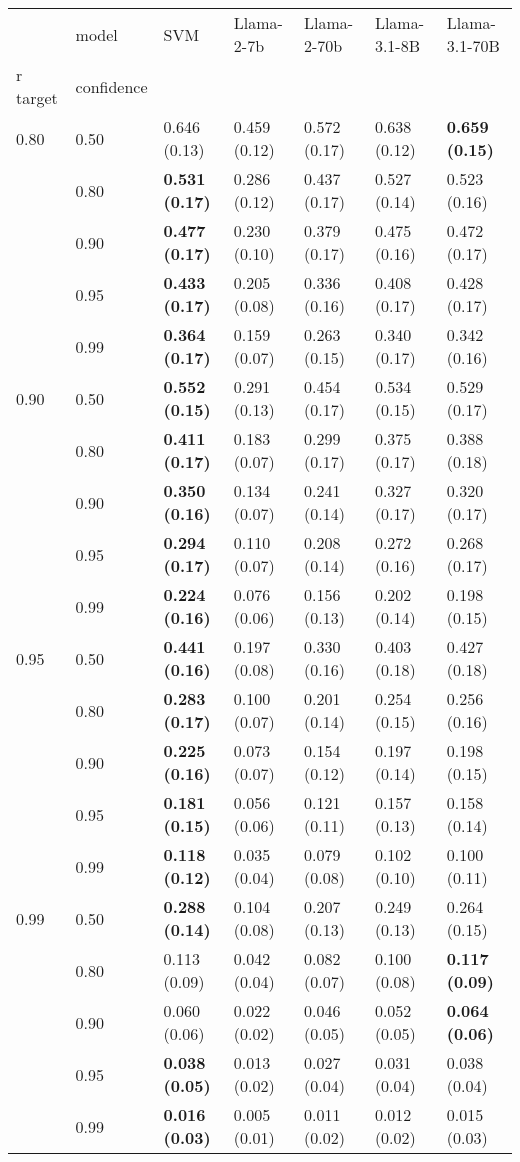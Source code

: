 \begin{tabular}{lllllll}
\toprule
 & model & SVM & Llama-2-7b & Llama-2-70b & Llama-3.1-8B & Llama-3.1-70B \\
r target & confidence &  &  &  &  &  \\
\midrule
0.80 & 0.50 & 0.646 (0.13) & 0.459 (0.12) & 0.572 (0.17) & 0.638 (0.12) & \textbf{0.659 (0.15)} \\
 & 0.80 & \textbf{0.531 (0.17)} & 0.286 (0.12) & 0.437 (0.17) & 0.527 (0.14) & 0.523 (0.16) \\
 & 0.90 & \textbf{0.477 (0.17)} & 0.230 (0.10) & 0.379 (0.17) & 0.475 (0.16) & 0.472 (0.17) \\
 & 0.95 & \textbf{0.433 (0.17)} & 0.205 (0.08) & 0.336 (0.16) & 0.408 (0.17) & 0.428 (0.17) \\
 & 0.99 & \textbf{0.364 (0.17)} & 0.159 (0.07) & 0.263 (0.15) & 0.340 (0.17) & 0.342 (0.16) \\
\cline{1-7}
0.90 & 0.50 & \textbf{0.552 (0.15)} & 0.291 (0.13) & 0.454 (0.17) & 0.534 (0.15) & 0.529 (0.17) \\
 & 0.80 & \textbf{0.411 (0.17)} & 0.183 (0.07) & 0.299 (0.17) & 0.375 (0.17) & 0.388 (0.18) \\
 & 0.90 & \textbf{0.350 (0.16)} & 0.134 (0.07) & 0.241 (0.14) & 0.327 (0.17) & 0.320 (0.17) \\
 & 0.95 & \textbf{0.294 (0.17)} & 0.110 (0.07) & 0.208 (0.14) & 0.272 (0.16) & 0.268 (0.17) \\
 & 0.99 & \textbf{0.224 (0.16)} & 0.076 (0.06) & 0.156 (0.13) & 0.202 (0.14) & 0.198 (0.15) \\
\cline{1-7}
0.95 & 0.50 & \textbf{0.441 (0.16)} & 0.197 (0.08) & 0.330 (0.16) & 0.403 (0.18) & 0.427 (0.18) \\
 & 0.80 & \textbf{0.283 (0.17)} & 0.100 (0.07) & 0.201 (0.14) & 0.254 (0.15) & 0.256 (0.16) \\
 & 0.90 & \textbf{0.225 (0.16)} & 0.073 (0.07) & 0.154 (0.12) & 0.197 (0.14) & 0.198 (0.15) \\
 & 0.95 & \textbf{0.181 (0.15)} & 0.056 (0.06) & 0.121 (0.11) & 0.157 (0.13) & 0.158 (0.14) \\
 & 0.99 & \textbf{0.118 (0.12)} & 0.035 (0.04) & 0.079 (0.08) & 0.102 (0.10) & 0.100 (0.11) \\
\cline{1-7}
0.99 & 0.50 & \textbf{0.288 (0.14)} & 0.104 (0.08) & 0.207 (0.13) & 0.249 (0.13) & 0.264 (0.15) \\
 & 0.80 & 0.113 (0.09) & 0.042 (0.04) & 0.082 (0.07) & 0.100 (0.08) & \textbf{0.117 (0.09)} \\
 & 0.90 & 0.060 (0.06) & 0.022 (0.02) & 0.046 (0.05) & 0.052 (0.05) & \textbf{0.064 (0.06)} \\
 & 0.95 & \textbf{0.038 (0.05)} & 0.013 (0.02) & 0.027 (0.04) & 0.031 (0.04) & 0.038 (0.04) \\
 & 0.99 & \textbf{0.016 (0.03)} & 0.005 (0.01) & 0.011 (0.02) & 0.012 (0.02) & 0.015 (0.03) \\
\cline{1-7}
\bottomrule
\end{tabular}
